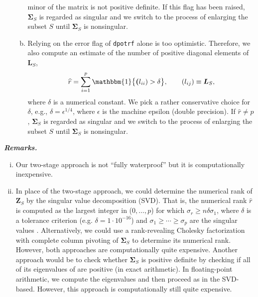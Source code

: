 \documentclass[a4paper,oneside,11pt,DIV=12]{scrartcl}
\newcommand{\code}[1]{{\texttt{#1}}}
\begin{document}
\begin{enumerate}[(1)]
\begin{enumerate}[a)]
				minor of the matrix is not positive definite. If this
				flag has been raised, $\bm \Sigma_S$ is regarded as
				singular and we switch to the process of enlarging the
				subset $S$ until $\bm \Sigma_S$ is nonsingular.
			\item Relying on the error flag of \code{dpotrf} alone is too
				optimistic. Therefore, we also compute an estimate of the
				number of positive diagonal elements of $\bm L_S$,
				\begin{equation}\label{eq:numericrank}
					\widehat{r} = \sum_{i=1}^p \mathbbm{1} \big\{ \bm (l_{ii})
						> \delta \big\}, \qquad (l_{ij}) \equiv \bm L_S,
				\end{equation}
				\noindent where $\delta$ is a numerical constant. We pick a
				rather conservative choice for $\delta$, e.g.,
				$\delta = \epsilon^{1/4}$, where $\epsilon$ is the machine
				epsilon (double precision). If $\widehat{r}\neq p$,
				$\bm \Sigma_S$ is regarded as singular and we switch to
				the process of enlarging the subset $S$ until
				$\bm \Sigma_S$ is nonsingular.
		\end{enumerate}
\end{enumerate}

\vspace{1em}
\noindent\textbf{\sffamily \small \itshape Remarks.}
\vspace{-0.5em}
\begin{enumerate}[i)]
	\item Our two-stage approach is not ``fully waterproof'' but it is
		computationally inexpensive.
	\item In place of the two-stage approach, we could determine the
		numerical rank of $\bm Z_S$ by the singular value decomposition
		(SVD). That is, the numerical rank $\widehat{r}$ is computed as
		the largest integer in ($0, \ldots, p$) for which
		$\sigma_r \geq n\delta \sigma_1$, where $\delta$ is a tolerance
		criterion (e.g. $\delta = 1 \cdot 10^{-16}$) and
		$\sigma_1 \geq \cdots \geq \sigma_p$ are the singular values
		\citep[][Chap. 2.5.5]{golub_loan_1996}. Alternatively, we could
		use a rank-revealing Cholesky factorization with complete
		column pivoting
		\citep[\code{LAPACK:} \code{dpstrf},][]{anderson_bai_etal_1999}
		of $\bm \Sigma_S$ to determine its numerical rank. However,
		both approaches are computationally quite expensive. Another
		approach would be to check whether $\bm \Sigma_S$ is positive
		definite by checking if all of its eigenvalues of are positive
		(in exact arithmetic). In floating-point arithmetic, we compute
		the eigenvalues
		\citep[\code{LAPACK}: \code{dsyev},][]{anderson_bai_etal_1999}
		and then proceed as in the SVD-based. However, this approach is
		computationally still quite expensive.
\end{enumerate}
\end{document}
